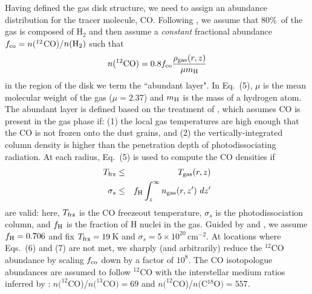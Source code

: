 {Having defined the gas disk structure, we need to assign an abundance
distribution for the tracer molecule, CO.  Following \citet{aikawa99}, we
assume that 80\%\ of the gas is composed of H$_2$ and then assume a {\it
constant} fractional abundance $f_{\rm co} = n(^{12}$CO)/$n({\rm H}_2)$ such
that
\begin{equation}
n(^{12}{\rm CO}) = 0.8 f_{\rm co} \frac{\rho_{\rm gas}(r, z)}{\mu m_{\rm H}}
\end{equation}
in the region of the disk we term the ``abundant layer".  In Eq.~(5), 
$\mu$ is the mean molecular weight of the gas ($\mu = 2.37$) and $m_{\rm H}$ is 
the mass of a hydrogen atom.  The abundant layer is defined based on the 
treatment of \citet{qi08,qi11}, which assumes CO is present in the gas phase if:
(1) the local gas temperatures are high enough that the CO is not frozen onto 
the dust grains, and (2) the vertically-integrated column density is higher than
the penetration depth of photodissociating radiation.  At each radius,
Eq.~(5) is used to compute the CO densities if
\begin{eqnarray}
T_{\rm frz} &\le& T_{\rm gas}(r, z) \\
\sigma_s &\le& f_{\rm H} \int_z^{\infty} n_{\rm gas}(r, z^{\prime}) \,\, dz^{\prime} 
\end{eqnarray}
are valid: here, $T_{\rm frz}$ is the CO freezeout temperature, $\sigma_s$ is
the photodissociation column, and $f_{\rm H}$ is the fraction of H nuclei in 
the gas.  Guided by \citet{aikawa99} and \citet{qi11}, we assume $f_{\rm H} = 
0.706$ and fix $T_{\rm frz} = 19$\,K and $\sigma_s = 
5\times10^{20}$\,cm$^{-2}$.  At locations where Eqs.~(6) and (7) are not met, 
we sharply (and arbitrarily) reduce the $^{12}$CO abundance by scaling 
$f_{\rm co}$ down by a factor of $10^8$.  The CO isotopologue abundances are 
assumed to follow $^{12}$CO with the interstellar medium ratios inferred by 
\citet{wilson99}: $n(^{12}$CO)/$n(^{13}$CO$) = 69$ and 
$n(^{12}$CO)/$n($C$^{18}$O$) = 557$.

}
